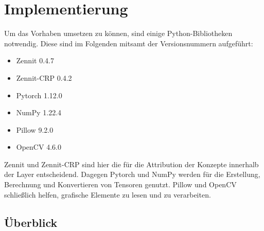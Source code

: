 \section{Implementierung}

Um das Vorhaben umsetzen zu können, sind einige Python-Bibliotheken notwendig. Diese sind im Folgenden mitsamt der Versionsnummern aufgeführt:

\begin{itemize}
    \item Zennit 0.4.7 \cite{anders2021software}
    \item Zennit-CRP 0.4.2 \cite{achtibat2022crpzennit}
    \item Pytorch 1.12.0 \cite{NEURIPS2019_9015}
    \item NumPy 1.22.4 \cite{harris2020array}
    \item Pillow 9.2.0 \cite{clark2015pillow}
    \item OpenCV 4.6.0 \cite{opencv_library}
\end{itemize}
Zennit und Zennit-CRP sind hier die für die Attribution der Konzepte innerhalb der Layer entscheidend.
Dagegen Pytorch und NumPy werden für die Erstellung, Berechnung und Konvertieren von Tensoren genutzt. Pillow und OpenCV schließlich helfen, grafische Elemente zu lesen und zu verarbeiten.
\subsection{Überblick}

